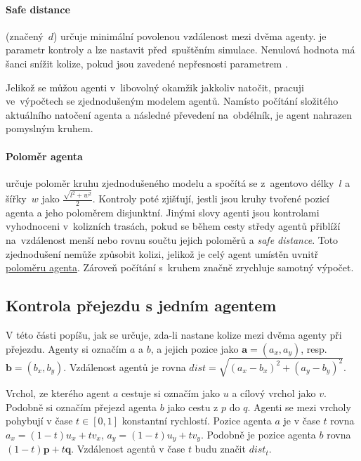 \paragraph{Safe distance}\label{par:safe_distance} (značený~$d$) určuje minimální povolenou vzdálenost mezi dvěma agenty.
 je parametr kontroly a lze nastavit před~spuštěním simulace.
Nenulová hodnota  má šanci snížit kolize,
pokud jsou zavedené nepřesnosti parametrem .

Jelikož se můžou agenti v~libovolný okamžik jakkoliv natočit, pracuji ve~výpočtech se zjednodušeným modelem agentů.
Namísto počítání složitého aktuálního natočení agenta a následné převedení na~obdélník,
je agent nahrazen pomyslným kruhem.

\paragraph{Poloměr agenta}\label{par:polomer_agenta} určuje poloměr kruhu zjednodušeného modelu
a spočítá se z~agentovo délky~$l$ a šířky~$w$ jako $\frac{\sqrt {l^2 + w^2}}{2}$.
Kontroly poté zjišťují, jestli jsou kruhy tvořené pozicí agenta a jeho poloměrem disjunktní.
Jinými slovy agenti jsou kontrolami vyhodnoceni v~kolizních trasách,
pokud se během cesty středy agentů přiblíží na~vzdálenost menší nebo rovnu součtu jejich poloměrů a \emph{safe distance}.
Toto zjednodušení nemůže způsobit kolizi, jelikož je celý agent umístěn uvnitř \hyperref[par:polomer_agenta]{poloměru agenta}.
Zároveň počítání s~kruhem značně zrychluje samotný výpočet.

\subsection{Kontrola přejezdu s jedním agentem}\label{subsec:kontrola_prejezdu_jeden_agent}

V této části popíšu, jak se určuje, zda-li nastane kolize mezi dvěma agenty při přejezdu.
Agenty si označím $a$ a $b$, a jejich pozice jako $\mathbf{a} = (a_x, a_y)$, resp. $\mathbf{b} = (b_x, b_y)$.
Vzdálenost agentů je rovna $dist = \sqrt{(a_x - b_x)^2 + (a_y - b_y)^2}$.

Vrchol, ze kterého agent $a$ cestuje si označím jako $u$ a cílový vrchol jako $v$.
Podobně si označím přejezd agenta $b$ jako cestu z $p$ do $q$.
Agenti se mezi vrcholy pohybují v čase $t \in [0, 1]$ konstantní rychlostí.
Pozice agenta $a$ je v čase $t$ rovna $a_x = (1-t)u_x + tv_x$, $a_y = (1-t)u_y + tv_y$.
Podobně je pozice agenta $b$ rovna $(1-t)\mathbf{p} + t\mathbf{q}$.
Vzdálenost agentů v čase $t$ budu značit $dist_t$.

